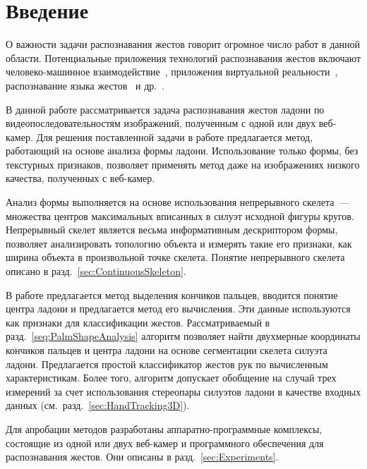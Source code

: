       \begin{multicols}{2}

            \label{st\stat}

\section{Введение}\label{sec:introduction}

О важности задачи распознавания жестов говорит огромное число работ в данной области.
Потенциальные приложения технологий распознавания жестов включают че\-ло\-ве\-ко-ма\-шин\-ное 
взаимодействие~\cite{BareHand3d2006},
приложения виртуальной реальности~\cite{GaVeDi}, распознавание языка 
жестов~\cite{GestureRecognitionVisapp2007} 
и др.~\cite{GestureRecognitionSurvey, VisionBasedReview2009}.

В данной работе рассматривается задача распознавания жестов ладони 
по видеопоследовательностям изображений, полученным с одной или двух веб-ка\-мер.
Для решения поставленной задачи в работе предлагается метод, работающий на 
основе анализа формы ладони.
Использование только формы, без текстурных признаков, позволяет применять 
метод даже на изображениях низкого качества, полученных с веб-камер.

Анализ формы выполняется на основе использования непрерывного скелета~---  
множества центров максимальных вписанных в силуэт исходной фигуры кругов.
Непрерывный скелет является весьма информативным дескриптором формы,
позволяет анализировать топологию объекта и измерять такие его признаки, 
как ширина объекта в произвольной точке скелета.
Понятие непрерывного скелета описано в разд.~\ref{sec:ContinuousSkeleton}.

В работе предлагается метод выделения кончиков 
пальцев, вводится понятие центра ладони и предлагается метод его вычисления.
Эти данные используются как признаки для классификации жес\-тов.
Рассматриваемый в разд.~\ref{seq:PalmShapeAnalysis} 
алгоритм позволяет найти двухмерные координаты кончиков 
пальцев и центра ладони на основе сегментации скелета силуэта ладони.
Предлагается простой классификатор жестов рук по вычисленным характеристикам.
Более того, алгоритм допускает обобщение на случай трех измерений за счет 
использования стереопары силуэтов ладони в качестве входных данных
(см.\ разд.~\ref{sec:HandTracking3D}).

Для апробации методов разработаны ап\-па\-рат\-но-про\-грам\-мные 
комплексы, состоящие из одной или двух веб-ка\-мер и программного 
обеспечения для распознавания жестов.
Они описаны в разд.~\ref{sec:Experiments}.


\end{multicols}
